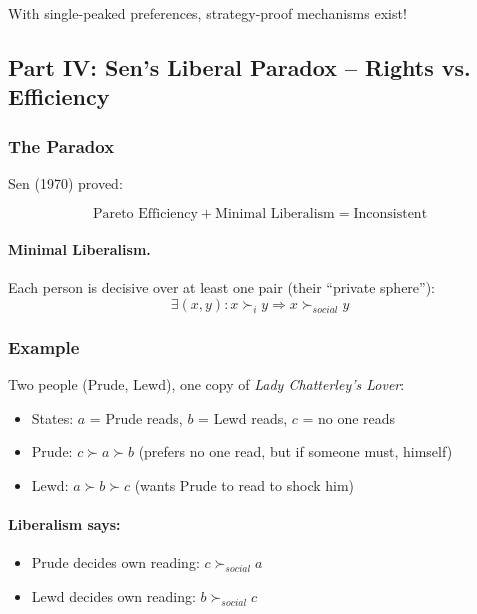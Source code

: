 With single-peaked preferences, strategy-proof mechanisms exist!

\subsection{Part IV: Sen's Liberal Paradox – Rights vs. Efficiency}

\subsubsection{The Paradox}

Sen (1970) proved:

\begin{equation}
\boxed{
\text{Pareto Efficiency} + \text{Minimal Liberalism} = \text{Inconsistent}
}
\label{eq:liberal}
\end{equation}

\paragraph{Minimal Liberalism.}
Each person is decisive over at least one pair (their ``private sphere''):
\begin{equation}
\exists (x, y): x \succ_i y \Rightarrow x \succ_{social} y
\end{equation}

\subsubsection{Example}

Two people (Prude, Lewd), one copy of \textit{Lady Chatterley's Lover}:
\begin{itemize}
    \item States: $a$ = Prude reads, $b$ = Lewd reads, $c$ = no one reads
    \item Prude: $c \succ a \succ b$ (prefers no one read, but if someone must, himself)
    \item Lewd: $a \succ b \succ c$ (wants Prude to read to shock him)
\end{itemize}

\paragraph{Liberalism says:}
\begin{itemize}
    \item Prude decides own reading: $c \succ_{social} a$
    \item Lewd decides own reading: $b \succ_{social} c$
\end{itemize}

